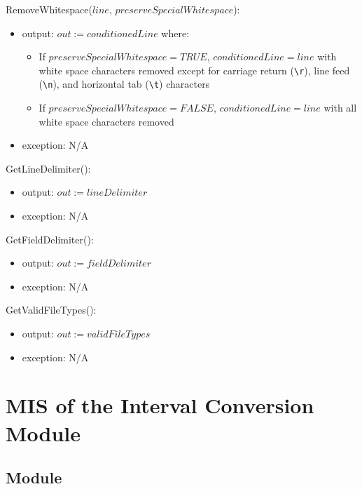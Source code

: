 \documentclass[12pt, titlepage]{article}
\begin{document}
\noindent RemoveWhitespace($line$, $preserveSpecialWhitespace$):
\begin{itemize}
	\item output: $out := conditionedLine$ where:
	\begin{itemize}
		\item If $preserveSpecialWhitespace = TRUE$, $conditionedLine = line$ 
		with white space characters removed except for carriage return 
		(\texttt{\textbackslash r}), line feed (\texttt{\textbackslash n}), and 
		horizontal tab (\texttt{\textbackslash t}) 
		characters
		\item If $preserveSpecialWhitespace = FALSE$, $conditionedLine = line$ 
		with all white space characters removed
	\end{itemize}
	\item exception: N/A
\end{itemize}

\noindent GetLineDelimiter():
\begin{itemize}
	\item output: $out := lineDelimiter$
	\item exception: N/A
\end{itemize}

\noindent GetFieldDelimiter():
\begin{itemize}
	\item output: $out := fieldDelimiter$
	\item exception: N/A
\end{itemize}

\noindent GetValidFileTypes():
\begin{itemize}
	\item output: $out := validFileTypes$
	\item exception: N/A
\end{itemize}

\newpage

\section{MIS of the Interval Conversion Module} 
\label{Module_intervalconversion}


\subsection{Module}
\end{document}
